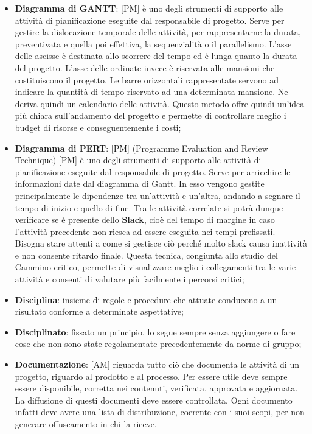\begin{itemize}
	\item \textbf {Diagramma di GANTT}: [PM] è uno degli strumenti di supporto alle attività di pianificazione eseguite dal responsabile di progetto. \newline
Serve per gestire la dislocazione temporale delle attività, per rappresentarne la durata, preventivata e quella poi effettiva, la sequenzialità o il parallelismo. \newline
L'asse delle ascisse è destinata allo scorrere del tempo ed è lunga quanto la durata del progetto. \newline
L'asse delle ordinate invece è riservata alle mansioni che costituiscono il progetto. \newline
Le barre orizzontali rappresentate servono ad indicare la quantità di tempo riservato ad una determinata mansione. Ne deriva quindi un calendario delle attività. \newline
Questo metodo offre quindi un'idea più chiara sull'andamento del progetto e permette di controllare meglio i budget di risorse e conseguentemente i costi;

	\item \textbf {Diagramma di PERT}: [PM] (Programme Evaluation and Review Technique) [PM] è uno degli strumenti di supporto alle attività di pianificazione eseguite dal responsabile di progetto. \newline
Serve per arricchire le informazioni date dal diagramma di Gantt. In esso vengono gestite principalmente le dipendenze tra un'attività e un'altra, andando a segnare il tempo di inizio e quello di fine. Tra le attività correlate si potrà dunque verificare se è presente dello \textbf{Slack}, cioè del tempo di margine in caso l'attività precedente non riesca ad essere eseguita nei tempi prefissati. Bisogna stare attenti a come si gestisce ciò perché molto slack causa inattività e non consente ritardo finale.   \newline
Questa tecnica, congiunta allo studio del Cammino critico, permette di visualizzare meglio i collegamenti tra le varie attività e consenti di valutare più facilmente i percorsi critici;

	\item \textbf{Disciplina}: insieme di regole e procedure che attuate conducono a un risultato conforme a determinate aspettative;
	\item \textbf{Disciplinato}: fissato un principio, lo segue sempre senza aggiungere o fare cose che non sono state regolamentate precedentemente da norme di gruppo;
	\item \textbf{Documentazione}: [AM] riguarda tutto ciò che documenta le attività di un progetto, riguardo al prodotto e al processo.
	Per essere utile deve sempre essere disponibile, corretta nei contenuti, verificata, approvata e aggiornata. La diffusione di questi documenti deve essere controllata. Ogni documento infatti deve avere una lista di distribuzione, coerente con i suoi scopi, per non generare offuscamento in chi la riceve.



\end{itemize}
